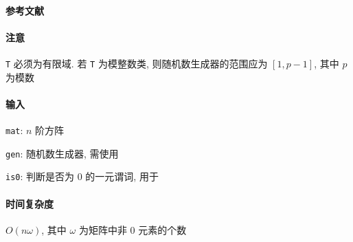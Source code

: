 \paragraph{参考文献} \cite{wiedemann1986solving}

\paragraph{注意} \verb|T| 必须为有限域. 若 \verb|T| 为模整数类, 则随机数生成器的范围应为 \([1, p-1]\), 其中 \(p\) 为模数

\paragraph{输入}

\verb|mat|: \(n\) 阶方阵

\verb|gen|: 随机数生成器, 需使用 

\verb|is0|: 判断是否为 \(0\) 的一元谓词, 用于 

\paragraph{时间复杂度}

\(O(n\omega)\), 其中 \(\omega\) 为矩阵中非 \(0\) 元素的个数
